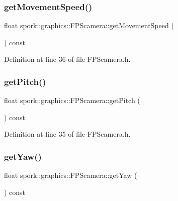 \subsubsection{\texorpdfstring{get\+Movement\+Speed()}{getMovementSpeed()}}
{\footnotesize\ttfamily float spork\+::graphics\+::\+F\+P\+Scamera\+::get\+Movement\+Speed (\begin{DoxyParamCaption}{ }\end{DoxyParamCaption}) const\hspace{0.3cm}{\ttfamily [inline]}}



Definition at line 36 of file F\+P\+Scamera.\+h.

\mbox{\label{classspork_1_1graphics_1_1_f_p_scamera_a454b2b504626eedd36cbd8d3c6500012}} 
\subsubsection{\texorpdfstring{get\+Pitch()}{getPitch()}}
{\footnotesize\ttfamily float spork\+::graphics\+::\+F\+P\+Scamera\+::get\+Pitch (\begin{DoxyParamCaption}{ }\end{DoxyParamCaption}) const\hspace{0.3cm}{\ttfamily [inline]}}



Definition at line 35 of file F\+P\+Scamera.\+h.

\mbox{\label{classspork_1_1graphics_1_1_f_p_scamera_a36b5388be9528874344a4fe791b807ed}} 
\subsubsection{\texorpdfstring{get\+Yaw()}{getYaw()}}
{\footnotesize\ttfamily float spork\+::graphics\+::\+F\+P\+Scamera\+::get\+Yaw (\begin{DoxyParamCaption}{ }\end{DoxyParamCaption}) const\hspace{0.3cm}{\ttfamily [inline]}}



